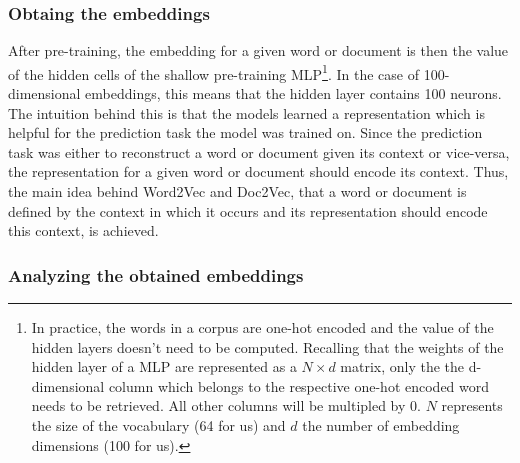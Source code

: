 \subsubsection{Obtaing the embeddings}
After pre-training, the embedding for a given word or document is then the value of the hidden cells of the shallow pre-training MLP\footnote{In practice, the words in a corpus are one-hot encoded and the value of the hidden layers doesn't need to be computed. Recalling that the weights of the hidden layer of a MLP are represented as a $N\times d$ matrix, only the the d-dimensional column which belongs to the respective one-hot encoded word needs to be retrieved. All other columns will be multipled by 0. $N$ represents the size of the vocabulary (64 for us) and $d$ the number of embedding dimensions (100 for us).}. In the case of 100-dimensional embeddings, this means that the hidden layer contains 100 neurons. The intuition behind this is that the models learned a representation which is helpful for the prediction task the model was trained on. Since the prediction task was either to reconstruct a word or document given its context or vice-versa, the representation for a given word or document should encode its context. Thus, the main idea behind Word2Vec and Doc2Vec, that a word or document is defined by the context in which it occurs and its representation should encode this context, is achieved.



\subsubsection{Analyzing the obtained embeddings}

